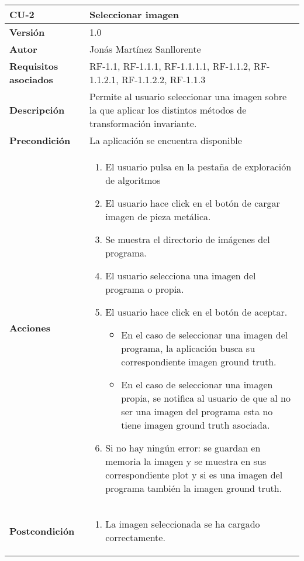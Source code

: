 \begin{table}[p]
	\centering
	\begin{tabularx}{\linewidth}{ p{} p{} }
		\toprule
		\textbf{CU-2}    & \textbf{Seleccionar imagen}\\
		\toprule
		\textbf{Versión}              & 1.0    \\
		\textbf{Autor}                & Jonás Martínez Sanllorente \\
		\textbf{Requisitos asociados} & RF-1.1, RF-1.1.1, RF-1.1.1.1, RF-1.1.2, RF-1.1.2.1, RF-1.1.2.2, RF-1.1.3 \\
		\textbf{Descripción}          & Permite al usuario seleccionar una imagen sobre la que aplicar los distintos métodos de transformación invariante.\\
		\textbf{Precondición}         & La aplicación se encuentra disponible \\
		\textbf{Acciones}             &
		\begin{enumerate}
			\def\labelenumi{\arabic{enumi}.}
			\tightlist
			\item El usuario pulsa en la pestaña de exploración de algoritmos
            \item El usuario hace click en el botón de cargar imagen de pieza metálica.
            \item Se muestra el directorio de imágenes del programa.
            \item El usuario selecciona una imagen del programa o propia.
            \item El usuario hace click en el botón de aceptar.
            \begin{itemize}
                \item En el caso de seleccionar una imagen del programa, la aplicación busca su correspondiente imagen ground truth.
                \item En el caso de seleccionar una imagen propia, se notifica al usuario de que al no ser una imagen del programa esta no tiene imagen ground truth asociada.
            \end{itemize}
            \item Si no hay ningún error: se guardan en memoria la imagen y se muestra en sus correspondiente plot y si es una imagen del programa también la imagen ground truth.
		\end{enumerate}\\
		\textbf{Postcondición}        & 
           \begin{enumerate}
                \item La imagen seleccionada se ha cargado correctamente.

\end{enumerate}
\end{tabularx}
\end{table}
